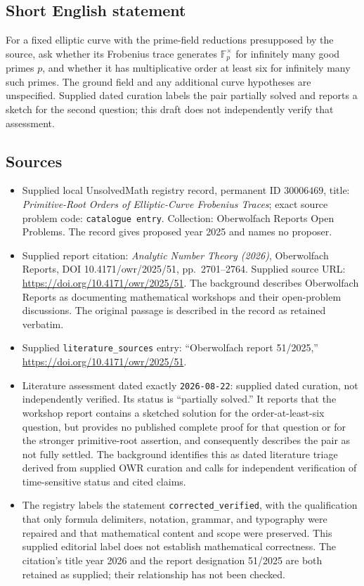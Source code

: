 \documentclass[11pt]{article}
\newcommand{\F}{\mathbb{F}}
\begin{document}
\subsection{Short English statement}
For a fixed elliptic curve with the prime-field reductions presupposed by the source, ask whether its Frobenius trace generates \(\F_p^{\times}\) for infinitely many good primes \(p\), and whether it has multiplicative order at least six for infinitely many such primes. The ground field and any additional curve hypotheses are unspecified. Supplied dated curation labels the pair partially solved and reports a sketch for the second question; this draft does not independently verify that assessment.
\subsection{Sources}
\begin{itemize}
\item Supplied local UnsolvedMath registry record, permanent ID \(30006469\), title: \emph{Primitive-Root Orders of Elliptic-Curve Frobenius Traces}; exact source problem code: \texttt{catalogue entry}. Collection: Oberwolfach Reports Open Problems. The record gives proposed year 2025 and names no proposer.
\item Supplied report citation: \emph{Analytic Number Theory (2026)}, Oberwolfach Reports, DOI 10.4171/owr/2025/51, pp.\ 2701--2764. Supplied source URL: \url{https://doi.org/10.4171/owr/2025/51}. The background describes Oberwolfach Reports as documenting mathematical workshops and their open-problem discussions. The original passage is described in the record as retained verbatim.
\item Supplied \texttt{literature\_sources} entry: ``Oberwolfach report 51/2025,'' \url{https://doi.org/10.4171/owr/2025/51}.
\item Literature assessment dated exactly \texttt{2026-08-22}: supplied dated curation, not independently verified. Its status is ``partially solved.'' It reports that the workshop report contains a sketched solution for the order-at-least-six question, but provides no published complete proof for that question or for the stronger primitive-root assertion, and consequently describes the pair as not fully settled. The background identifies this as dated literature triage derived from supplied OWR curation and calls for independent verification of time-sensitive status and cited claims.
\item The registry labels the statement \texttt{corrected\_verified}, with the qualification that only formula delimiters, notation, grammar, and typography were repaired and that mathematical content and scope were preserved. This supplied editorial label does not establish mathematical correctness. The citation's title year 2026 and the report designation 51/2025 are both retained as supplied; their relationship has not been checked.
\end{itemize}
\end{document}

